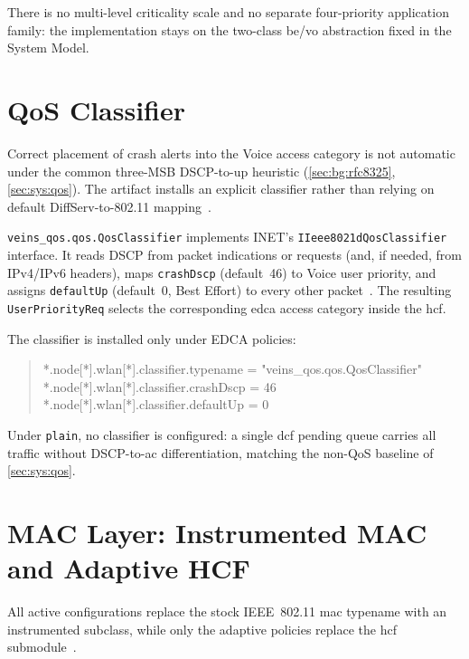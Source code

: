 There is no multi-level criticality scale and no separate four-priority application family: the implementation stays on the two-class \gls{be}/\gls{vo} abstraction fixed in the System Model.

\section{QoS Classifier}
\label{sec:impl:classifier}

Correct placement of crash alerts into the Voice access category is not automatic under the common three-MSB DSCP-to-\gls{up} heuristic (\autoref{sec:bg:rfc8325}, \autoref{sec:sys:qos}).
The artifact installs an explicit classifier rather than relying on default DiffServ-to-802.11 mapping~\cite{RFC8325_WiFi_QoS}.

\texttt{veins\_qos.qos.QosClassifier} implements INET's \texttt{IIeee8021dQosClassifier} interface.
It reads DSCP from packet indications or requests (and, if needed, from IPv4/IPv6 headers), maps \texttt{crashDscp} (default~46) to Voice user priority, and assigns \texttt{defaultUp} (default~0, Best Effort) to every other packet~\cite{RFC8325_WiFi_QoS,IEEE80211e_2005,aguiar2026_veins_qos}.
The resulting \texttt{UserPriorityReq} selects the corresponding \gls{edca} access category inside the \gls{hcf}.

The classifier is installed only under EDCA policies:

\begin{quote}
\footnotesize
\ttfamily
*.node[*].wlan[*].classifier.typename = "veins\_qos.qos.QosClassifier"\\
*.node[*].wlan[*].classifier.crashDscp = 46\\
*.node[*].wlan[*].classifier.defaultUp = 0
\end{quote}

Under \texttt{plain}, no classifier is configured: a single \gls{dcf} pending queue carries all traffic without DSCP-to-\gls{ac} differentiation, matching the non-QoS baseline of \autoref{sec:sys:qos}.

\section{MAC Layer: Instrumented MAC and Adaptive HCF}
\label{sec:impl:mac}

All active configurations replace the stock IEEE~802.11 \gls{mac} typename with an instrumented subclass, while only the adaptive policies replace the \gls{hcf} submodule~\cite{IEEE80211e_2005,inet_framework,aguiar2026_veins_qos}.

